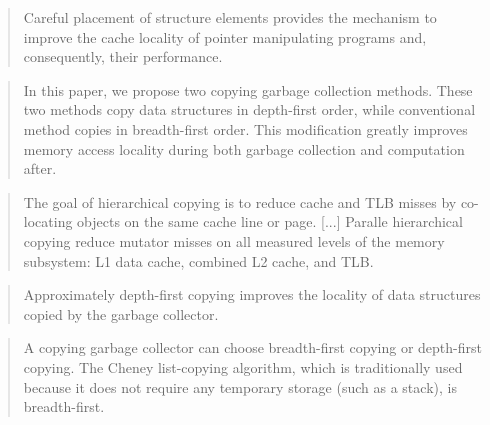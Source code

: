 \documentclass[a4paper,oneside]{memoir}
\begin{document}

\blockquote{Careful placement of structure elements provides the mechanism to
improve the cache locality of pointer manipulating programs and, consequently,
their performance.}
\cite{Chilimbi:1999}



\blockquote{In this paper, we propose two copying garbage collection methods.
These two methods copy data structures in depth-first order, while conventional
method copies in breadth-first order. This modification greatly improves memory
access locality during both garbage collection and computation after.\cite{Nakashima:1995}}


\blockquote{The goal of hierarchical copying is to reduce cache and TLB misses
by co-locating objects on the same cache line or page. [...] Paralle hierarchical
copying reduce mutator misses on all measured levels of the memory subsystem:
L1 data cache, combined L2 cache, and TLB.\cite{Siegwart:2006}}


\blockquote{Approximately depth-first copying improves the locality of
data structures copied by the garbage collector.}
\cite{Moon:1984}


\blockquote{A copying garbage collector can choose breadth-first copying or
depth-first copying. The Cheney list-copying algorithm, which is traditionally
used because it does not require any temporary storage (such as a stack), is
breadth-first.\cite{Moon:1984}}
\end{document}
